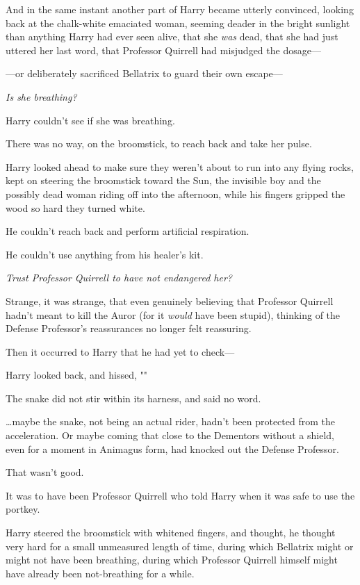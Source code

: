 And in the same instant another part of Harry became utterly convinced, looking 
back at the chalk-white emaciated woman, seeming deader in the bright sunlight 
than anything Harry had ever seen alive, that she \emph{was} dead, that she had 
just uttered her last word, that Professor Quirrell had misjudged the dosage---

---or deliberately sacrificed Bellatrix to guard their own escape---

\emph{Is she breathing?}

Harry couldn't see if she was breathing.

There was no way, on the broomstick, to reach back and take her pulse.

Harry looked ahead to make sure they weren't about to run into any flying 
rocks, kept on steering the broomstick toward the Sun, the invisible boy and 
the possibly dead woman riding off into the afternoon, while his fingers 
gripped the wood so hard they turned white.

He couldn't reach back and perform artificial respiration.

He couldn't use anything from his healer's kit.

\emph{Trust Professor Quirrell to have not endangered her?}

Strange, it was strange, that even genuinely believing that Professor Quirrell 
hadn't meant to kill the Auror (for it \emph{would} have been stupid), thinking 
of the Defense Professor's reassurances no longer felt reassuring.

Then it occurred to Harry that he had yet to check---

Harry looked back, and hissed, ""

The snake did not stir within its harness, and said no word.

{\ldots}maybe the snake, not being an actual rider, hadn't been protected from 
the acceleration. Or maybe coming that close to the Dementors without a shield, 
even for a moment in Animagus form, had knocked out the Defense Professor.

That wasn't good.

It was to have been Professor Quirrell who told Harry when it was safe to use 
the portkey.

Harry steered the broomstick with whitened fingers, and thought, he thought 
very hard for a small unmeasured length of time, during which Bellatrix might 
or might not have been breathing, during which Professor Quirrell himself might 
have already been not-breathing for a while.


